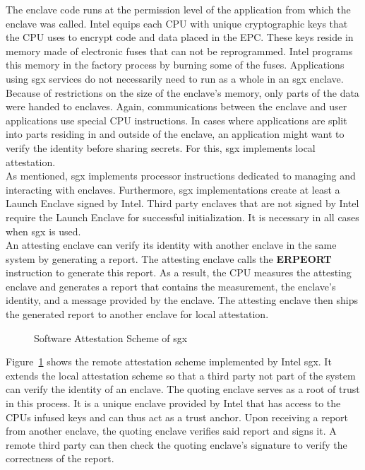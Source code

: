 The enclave code runs at the permission level of the application from which the
enclave was called. Intel equips each CPU with unique cryptographic keys that
the CPU uses to encrypt code and data placed in the EPC. These keys reside in
memory made of electronic fuses that can not be reprogrammed. Intel programs
this memory in the factory process by burning some of the fuses. Applications
using \gls{sgx} services do not necessarily need to run as a whole in an
\gls{sgx} enclave. Because of restrictions on the size of the enclave's memory,
only parts of the data were handed to enclaves. Again, communications between
the enclave and user applications use special CPU instructions. In cases where
applications are split into parts residing in and outside of the enclave, an
application might want to verify the identity before sharing secrets. For this,
\gls{sgx} implements local attestation.\\

As mentioned, \gls{sgx} implements processor instructions dedicated to managing
and interacting with enclaves. Furthermore, \gls{sgx} implementations create at
least a Launch Enclave signed by Intel. Third party enclaves that are not signed
by Intel require the Launch Enclave for successful initialization. It is
necessary in all cases when \gls{sgx} is used.\\

An attesting enclave can verify its identity with another enclave in the same
system by generating a report. The attesting enclave calls the \textbf{ERPEORT}
instruction to generate this report. As a result, the CPU measures the attesting
enclave and generates a report that contains the measurement, the enclave's
identity, and a message provided by the enclave. The attesting enclave then
ships the generated report to another enclave for local attestation.
\begin{center}
    \begin{figure}
        \centering
        
        \caption{Software Attestation Scheme of \gls{sgx}}
        \label{fig:state:tee:sgx_attestation}
    \end{figure}
\end{center}
Figure~\ref{fig:state:tee:sgx_attestation} shows the remote attestation scheme
implemented by Intel \gls{sgx}. It extends the local attestation scheme so that
a third party not part of the system can verify the identity of an enclave. The
quoting enclave serves as a root of trust in this process. It is a unique
enclave provided by Intel that has access to the CPUs infused keys and can thus
act as a trust anchor. Upon receiving a report from another enclave, the quoting
enclave verifies said report and signs it. A remote third party can then check
the quoting enclave's signature to verify the correctness of the report.

